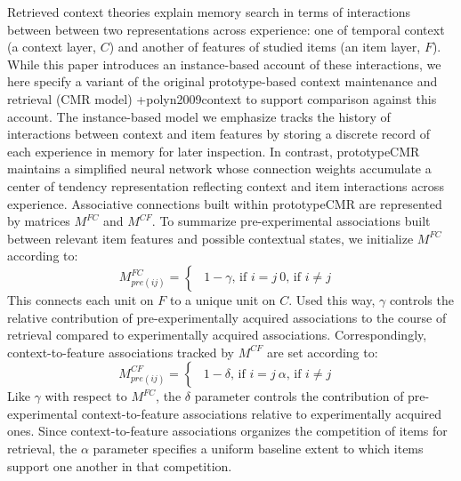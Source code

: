 \markdownRendererInterblockSeparator
{}Retrieved context theories explain memory search in terms of interactions between between two representations across experience: one of temporal context (a context layer, $C$) and another of features of studied items (an item layer, $F$). While this paper introduces an instance-based account of these interactions, we here specify a variant of the original prototype-based context maintenance and retrieval (CMR model) +{}{}{polyn2009context} to support comparison against this account. The instance-based model we emphasize tracks the history of interactions between context and item features by storing a discrete record of each experience in memory for later inspection. In contrast, prototypeCMR maintains a simplified neural network whose connection weights accumulate a center of tendency representation reflecting context and item interactions across experience. \markdownRendererInterblockSeparator
{}\markdownRendererInterblockSeparator
{}Associative connections built within prototypeCMR are represented by matrices $M^{FC}$ and $M^{CF}$.\markdownRendererInterblockSeparator
{}To summarize pre-experimental associations built between relevant item features and possible contextual states, we initialize $M^{FC}$ according to:\markdownRendererInterblockSeparator
{}$$M^{FC}_{pre(ij)} = \begin{cases} \begin{alignedat}{2} 1 - \gamma \text{, if } i=j \ 0 \text{, if } i \neq j\ \end{alignedat} \end{cases}$$\markdownRendererInterblockSeparator
{}This connects each unit on $F$ to a unique unit on $C$. Used this way, $\gamma$ controls the relative contribution of pre-experimentally acquired associations to the course of retrieval compared to experimentally acquired associations. Correspondingly, context-to-feature associations tracked by $M^{CF}$ are set according to:\markdownRendererInterblockSeparator
{}$$M^{CF}_{pre(ij)} = \begin{cases} \begin{alignedat}{2} 1 - \delta \text{, if } i=j \ \alpha \text{, if } i \neq j\ \end{alignedat} \end{cases}$$\markdownRendererInterblockSeparator
{}Like $\gamma$ with respect to $M^{FC}$, the $\delta$ parameter controls the contribution of pre-experimental context-to-feature associations relative to experimentally acquired ones. Since context-to-feature associations organizes the competition of items for retrieval, the $\alpha$ parameter specifies a uniform baseline extent to which items support one another in that competition.\markdownRendererInterblockSeparator
